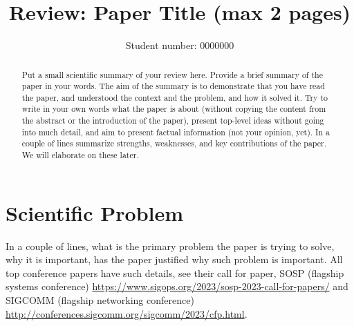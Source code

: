\documentclass[sigconf,10pt, screen]{acmart}
\begin{document}
\title{Review: Paper Title (max 2 pages)}



\author{Student number: 0000000}
\affiliation{%
  \institution{}
  \country{}
}

\begin{abstract}
Put a small scientific summary of your review here. Provide a brief summary of the paper in your words. The aim of the summary is to demonstrate that you have read the paper, and understood the context and the problem, and how it solved it. Try to write in your own words what the paper is about (without copying the content from the abstract or the introduction of the paper), present top-level ideas without going into much detail, and aim to present factual information (not your opinion, yet). In a couple of lines summarize strengths, weaknesses, and key contributions of the paper. We will elaborate on these later. 
\end{abstract}

\maketitle

\section{Scientific Problem}
In a couple of lines, what is the primary problem the paper is trying to solve, why it is important, has the paper justified why such problem is important. All top conference papers have such details, see their call for paper, SOSP (flagship systems conference) \url{https://www.sigops.org/2023/sosp-2023-call-for-papers/} and SIGCOMM (flagship networking conference) \url{http://conferences.sigcomm.org/sigcomm/2023/cfp.html}. 
\end{document}

